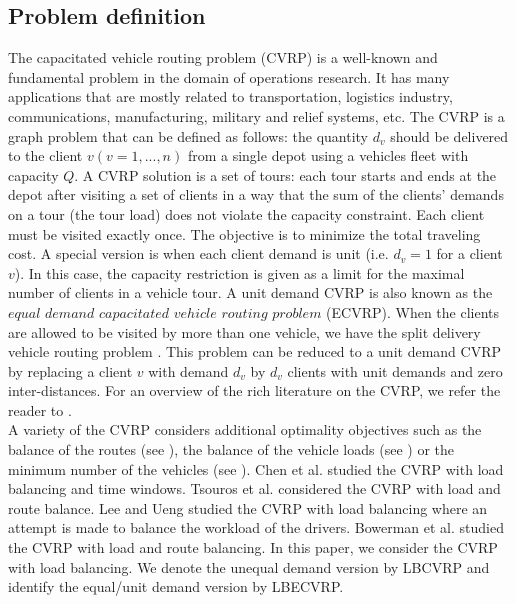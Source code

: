 \subsection{Problem definition}
\indent The capacitated vehicle routing problem (CVRP) is a well-known and fundamental problem in the domain of operations research. It has many applications that are mostly related to transportation, logistics industry, communications, manufacturing, military and relief systems, etc. The CVRP is a graph problem that can be defined as follows: the quantity $d_v$ should be delivered to the client $v (v=1,...,n)$ from a single depot using a vehicles fleet with capacity $Q$. A CVRP solution is a set of tours: each tour starts and ends at the depot after visiting a set of clients in a way that the sum of the clients' demands on a tour (the tour load) does not violate the capacity constraint. Each client must be visited exactly once. The objective is to minimize the total traveling cost. A special version is when each client demand is unit (i.e. $d_v=1$ for a client $v$). In this case, the capacity restriction is given as a limit for the maximal number of clients in a vehicle tour. A unit demand CVRP is also known as the $equal \,\, demand \,\,capacitated \,\,vehicle \,\,routing \,\,problem$ (ECVRP). When the clients are allowed to be visited by more than one vehicle, we have the split delivery vehicle routing problem \cite{Dror}. This problem can be reduced to a unit demand CVRP by replacing a client $v$ with demand $d_v$ by $d_v$ clients with unit demands and zero inter-distances. For an overview of the rich literature on the CVRP, we refer the reader to \cite{Altinkemer1990,Altinkemer1987,Baldacci,Bompadre,Chandran,Frederickson,Haimovich1988,Haimovich1985,Laporte,Li,Marinakis}. \\
\indent  A variety of the CVRP considers additional optimality objectives such as the balance of the routes (see \cite{Zhou}), the balance of the vehicle loads (see \cite{Bowerman}) or the minimum number of the vehicles (see \cite{Bowerman}). Chen et al. \cite{Chen2008} studied the CVRP with load balancing and time windows. Tsouros et al. \cite{Tsouros} considered the CVRP with load and route balance. Lee and Ueng \cite{Lee} studied the CVRP with load balancing where an attempt is made to balance the workload of the drivers. Bowerman et al. \cite{Bowerman} studied the CVRP with load and route balancing. In this paper, we consider the CVRP with load balancing. We denote the unequal demand version by LBCVRP and identify the equal/unit demand version by LBECVRP.\\
